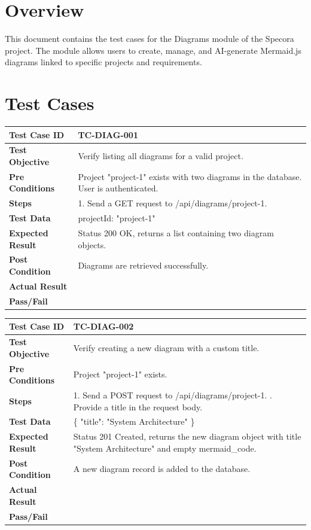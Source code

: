\section{Overview}
This document contains the test cases for the Diagrams module of the Specora project. The module allows users to create, manage, and AI-generate Mermaid.js diagrams linked to specific projects and requirements.

\section{Test Cases}

\begin{longtable}{|p{}|p{}|}
\hline
\textbf{Test Case ID} & TC-DIAG-001 \\ \hline
\textbf{Test Objective} & Verify listing all diagrams for a valid project. \\ \hline
\textbf{Pre Conditions} & Project "project-1" exists with two diagrams in the database. User is authenticated. \\ \hline
\textbf{Steps} & 
1. Send a GET request to /api/diagrams/project-1. \\ \hline
\textbf{Test Data} & projectId: "project-1" \\ \hline
\textbf{Expected Result} & Status 200 OK, returns a list containing two diagram objects. \\ \hline
\textbf{Post Condition} & Diagrams are retrieved successfully. \\ \hline
\textbf{Actual Result} &  \\ \hline
\textbf{Pass/Fail} &  \\ \hline
\end{longtable}

\begin{longtable}{|p{}|p{}|}
\hline
\textbf{Test Case ID} & TC-DIAG-002 \\ \hline
\textbf{Test Objective} & Verify creating a new diagram with a custom title. \\ \hline
\textbf{Pre Conditions} & Project "project-1" exists. \\ \hline
\textbf{Steps} & 
1. Send a POST request to /api/diagrams/project-1. \newline
2. Provide a title in the request body. \\ \hline
\textbf{Test Data} & \{ "title": "System Architecture" \} \\ \hline
\textbf{Expected Result} & Status 201 Created, returns the new diagram object with title "System Architecture" and empty mermaid\_code. \\ \hline
\textbf{Post Condition} & A new diagram record is added to the database. \\ \hline
\textbf{Actual Result} &  \\ \hline
\textbf{Pass/Fail} &  \\ \hline
\end{longtable}

